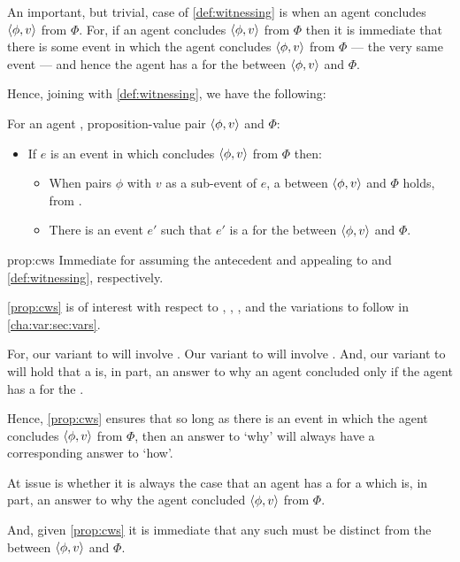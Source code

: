 \begin{note}
  An important, but trivial, case of \autoref{def:witnessing} is when an agent concludes \(\langle \phi, v \rangle\) from \(\Phi\).
  For, if an agent concludes \(\langle \phi, v \rangle\) from \(\Phi\) then it is immediate that there is some event in which the agent concludes \(\langle \phi, v \rangle\) from \(\Phi\) --- the very same event --- and hence the agent has a \wit{} for the \ros{} between \(\langle \phi, v \rangle\) and \(\Phi\).

  Hence, joining \supportI{} with \autoref{def:witnessing}, we have the following:

  \begin{proposition}
    \label{prop:cws}
    For an agent \vAgent{}, proposition-value pair \(\langle \phi, v \rangle\) and \poP{} \(\Phi\):
    \begin{itemize}
    \item
      If \(e\) is an event in which \vAgent{} concludes \(\langle \phi, v \rangle\) from \(\Phi\) then:
      \begin{itemize}
      \item
        When \vAgent{} pairs \(\phi\) with \(v\) as a sub-event of \(e\), a \ros{} between \(\langle \phi, v \rangle\) and \(\Phi\) holds, from .
      \item
        There is an event \(e'\) such that \(e'\) is a \wit{} for the \ros{} between \(\langle \phi, v \rangle\) and \(\Phi\).
      \end{itemize}
    \end{itemize}
    \vspace{-\baselineskip}
  \end{proposition}

  \begin{argument}{prop:cws}
    Immediate for assuming the antecedent and appealing to \supportI{} and \autoref{def:witnessing}, respectively.
  \end{argument}

  \autoref{prop:cws} is of interest with respect to \qWhy{}, \qHow{}, \issueInclusion{}, and the variations to follow in \autoref{cha:var:sec:vars}.

  For, our variant to \qWhy{} will involve .
  Our variant to \qHow{} will involve .
  And, our variant to \issueInclusion{} will hold that a \ros{} is, in part, an answer to why an agent concluded only if the agent has a \wit{} for the \ros{}.

  Hence, \autoref{prop:cws} ensures that so long as there is an event in which the agent concludes \(\langle \phi, v \rangle\) from \(\Phi\), then an answer to `why' will always have a corresponding answer to `how'.

  At issue is whether it is always the case that an agent has a \wit{} for a \ros{} which is, in part, an answer to why the agent concluded \(\langle \phi, v \rangle\) from \(\Phi\).

  And, given \autoref{prop:cws} it is immediate that any such \ros{} must be distinct from the \ros{} between \(\langle \phi, v \rangle\) and \(\Phi\).
\end{note}

